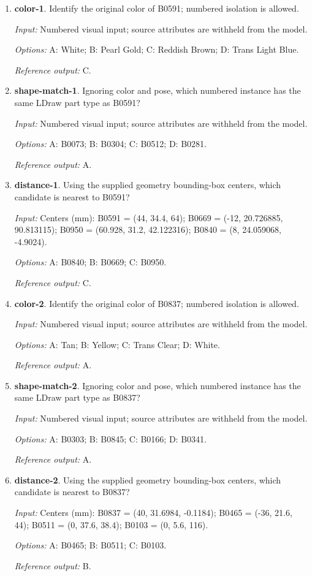 \begin{enumerate}
\item \textbf{color-1}. Identify the original color of B0591; numbered isolation is allowed.\par {\small \textit{Input:} Numbered visual input; source attributes are withheld from the model. \par\textit{Options:} A: White; B: Pearl Gold; C: Reddish Brown; D: Trans Light Blue. \par\textit{Reference output:} C.}
\item \textbf{shape-match-1}. Ignoring color and pose, which numbered instance has the same LDraw part type as B0591?\par {\small \textit{Input:} Numbered visual input; source attributes are withheld from the model. \par\textit{Options:} A: B0073; B: B0304; C: B0512; D: B0281. \par\textit{Reference output:} A.}
\item \textbf{distance-1}. Using the supplied geometry bounding-box centers, which candidate is nearest to B0591?\par {\small \textit{Input:} Centers (mm): B0591 = (44, 34.4, 64); B0669 = (-12, 20.726885, 90.813115); B0950 = (60.928, 31.2, 42.122316); B0840 = (8, 24.059068, -4.9024). \par\textit{Options:} A: B0840; B: B0669; C: B0950. \par\textit{Reference output:} C.}
\item \textbf{color-2}. Identify the original color of B0837; numbered isolation is allowed.\par {\small \textit{Input:} Numbered visual input; source attributes are withheld from the model. \par\textit{Options:} A: Tan; B: Yellow; C: Trans Clear; D: White. \par\textit{Reference output:} A.}
\item \textbf{shape-match-2}. Ignoring color and pose, which numbered instance has the same LDraw part type as B0837?\par {\small \textit{Input:} Numbered visual input; source attributes are withheld from the model. \par\textit{Options:} A: B0303; B: B0845; C: B0166; D: B0341. \par\textit{Reference output:} A.}
\item \textbf{distance-2}. Using the supplied geometry bounding-box centers, which candidate is nearest to B0837?\par {\small \textit{Input:} Centers (mm): B0837 = (40, 31.6984, -0.1184); B0465 = (-36, 21.6, 44); B0511 = (0, 37.6, 38.4); B0103 = (0, 5.6, 116). \par\textit{Options:} A: B0465; B: B0511; C: B0103. \par\textit{Reference output:} B.}

\end{enumerate}
